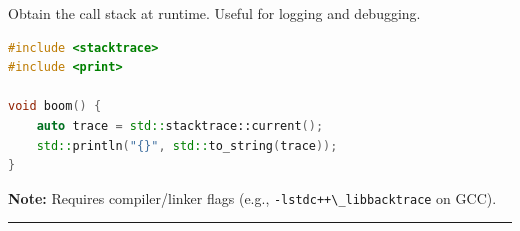 Obtain the call stack at runtime. Useful for logging and debugging.

\begin{lstlisting}[language={C++}]
#include <stacktrace>
#include <print>

void boom() {
    auto trace = std::stacktrace::current();
    std::println("{}", std::to_string(trace));
}
\end{lstlisting}

\textbf{Note:} Requires compiler/linker flags (e.g.,
\passthrough{\lstinline!-lstdc++\_libbacktrace!} on GCC).

\begin{center}\rule{0.5\linewidth}{0.5pt}\end{center}
